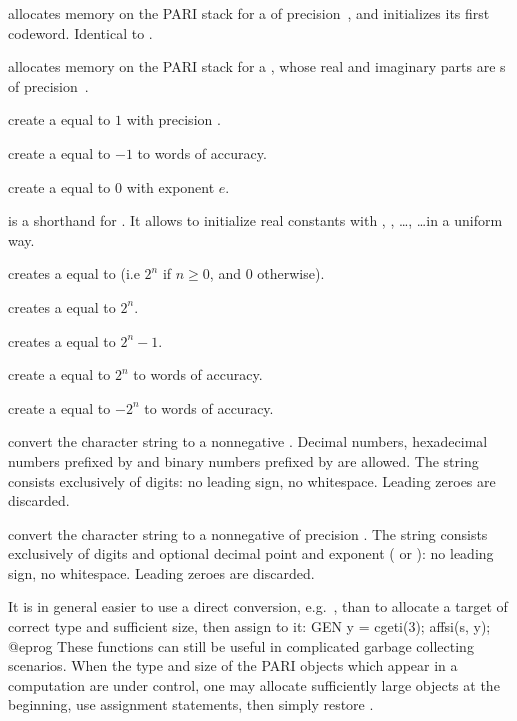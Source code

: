  allocates memory on the PARI stack for a 
of precision~, and initializes its first codeword. Identical to
.

 allocates memory on the PARI stack for a
, whose real and imaginary parts are s
of precision~.

 create a  equal to $1$ with
precision .

 create a  equal to $-1$ to 
words of accuracy.

 create a  equal to $0$ with
exponent $e$.

 is a shorthand for .
It allows to initialize real constants with , ,
\dots {},  \dots in a uniform way.

 creates a  equal to  (i.e
$2^n$ if $n \geq 0$, and $0$ otherwise).

 creates a  equal to $2^n$.

 creates a  equal to $2^n - 1$.

 create a  equal to $2^n$
to  words of accuracy.

 create a  equal to $-2^n$
to  words of accuracy.

 convert the character string  to a
nonnegative .
Decimal numbers, hexadecimal numbers prefixed by  and binary numbers prefixed
by  are allowed.  The string  consists exclusively of digits:
no leading sign, no whitespace. Leading zeroes are discarded.

 convert the character string  to
a nonnegative  of precision . The string 
consists exclusively of digits and optional decimal point and exponent
( or ): no leading sign, no whitespace. Leading zeroes are
discarded.

It is in general easier to use a direct conversion,
e.g.~, than to allocate a target of correct type and
sufficient size, then assign to it:
\bprog
  GEN y = cgeti(3); affsi(s, y);
@eprog\noindent
These functions can still be useful in complicated garbage
collecting scenarios. When the type and size of the PARI objects which appear
in a computation are under control, one may allocate sufficiently large
objects at the beginning, use assignment statements, then simply restore
.

